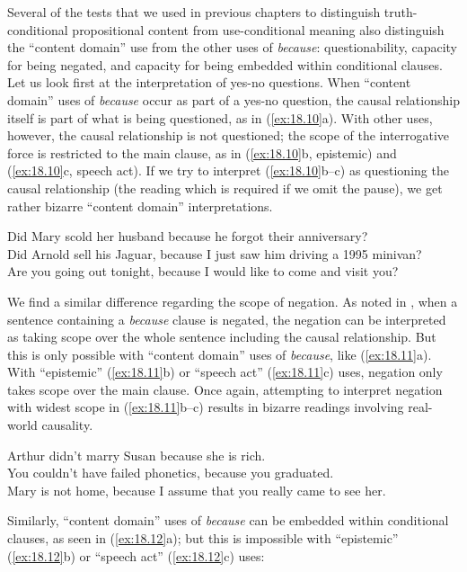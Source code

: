 Several of the tests that we used in previous chapters to distinguish truth-conditional propositional content from use-conditional meaning also distinguish the “content domain” use from the other uses of \textit{because}: questionability, capacity for being negated, and capacity for being embedded within conditional clauses. Let us look first at the interpretation of yes-no questions. When “content domain” uses of \textit{because} occur as part of a yes-no question, the causal relationship itself is part of what is being questioned, as in (\ref{ex:18.10}a). With other uses, however, the causal relationship is not questioned; the scope of the interrogative force is restricted to the main clause, as in (\ref{ex:18.10}b, epistemic) and (\ref{ex:18.10}c, speech act). If we try to interpret (\ref{ex:18.10}b--c) as questioning the causal relationship (the reading which is required if we omit the pause), we get rather bizarre “content domain” interpretations.


\ea \label{ex:18.10}
\ea  Did Mary scold her husband because he forgot their anniversary?\\
\ex Did Arnold sell his Jaguar, because I just saw him driving a 1995 minivan?\\
\ex Are you going out tonight, because I would like to come and visit you?
                       \z
\z


We find a similar difference regarding the scope of negation. As noted in , when a sentence containing a \textit{because} clause is negated, the negation can be interpreted as taking scope over the whole sentence including the causal relationship. But this is only possible with “content domain” uses of \textit{because}, like (\ref{ex:18.11}a). With “epistemic” (\ref{ex:18.11}b) or “speech act” (\ref{ex:18.11}c) uses, negation only takes scope over the main clause. Once again, attempting to interpret negation with widest scope in (\ref{ex:18.11}b--c) results in bizarre readings involving real-world causality.


\ea \label{ex:18.11}
\ea  Arthur didn’t marry Susan because she is rich.\\
\ex You couldn’t have failed phonetics, because you graduated.\\
\ex Mary is not home, because I assume that you really came to see her.
                       \z
\z


Similarly, “content domain” uses of \textit{because} can be embedded within conditional clauses, as seen in (\ref{ex:18.12}a); but this is impossible with “epistemic” (\ref{ex:18.12}b) or “speech act” (\ref{ex:18.12}c) uses:



